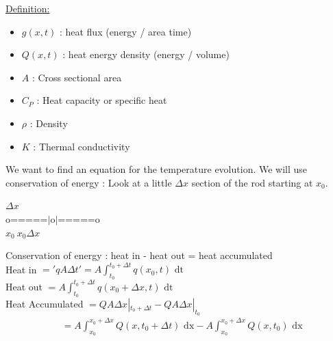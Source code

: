 \documentclass{article}
\newcommand{\dfn}{\underline{Definition:} }
\begin{document}
\dfn
\begin{itemize}
  \item $g(x, t)$ : heat flux (energy / area time)
  \item $Q(x, t)$ : heat energy density (energy / volume)
  \item $A$ : Cross sectional area
  \item $C_P$ : Heat capacity or specific heat
  \item $\rho$ : Density
  \item $K$ : Thermal conductivity
\end{itemize}
We want to find an equation for the temperature evolution. We will use conservation of energy : Look at a little $\Delta x$ section of the rod starting at $x_0$.
\begin{center}
  $\Delta x$\\
  o=====$|$o$|$=====o\\
  $x_0\  x_0\Delta x$
\end{center}
Conservation of energy : heat in - heat out = heat accumulated\\
Heat in $ = 'qA\Delta t' = A \int_{t_0}^{t_0 + \Delta t} q(x_0, t) \text{ dt}$\\
Heat out $ = A\int_{t_0}^{t_0 + \Delta t} q(x_0 + \Delta x, t) \text{ dt}$\\
Heat Accumulated $ = QA\Delta x |_{t_0 + \Delta t} - QA\Delta x|_{t_0}$
\begin{align}
  & = A\int^{x_0 + \Delta x}_{x_0} Q(x, t_0 + \Delta t) \text{ dx} - A\int^{x_0 + \Delta x}_{x_0} Q(x, t_0) \text{ dx}
\end{align}
\newpage
\end{document}
